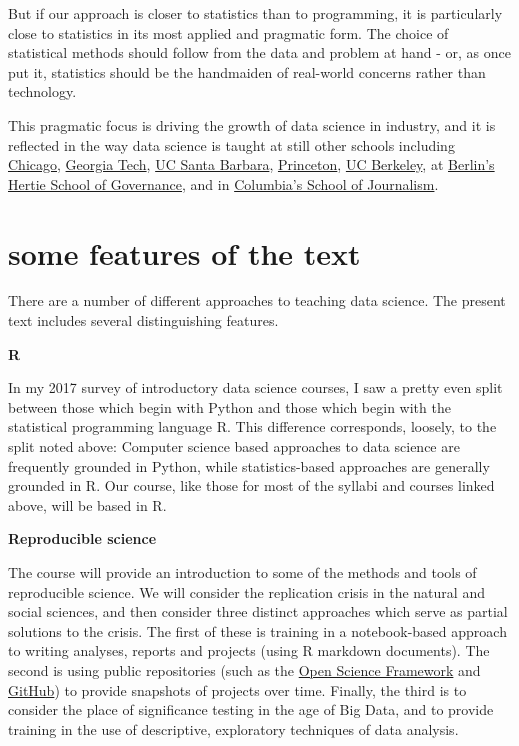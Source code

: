 \documentclass[
  openany]{book}
\begin{document}
But if our approach is closer to statistics than to programming, it is particularly close to statistics in its most applied and pragmatic form. The choice of statistical methods should follow from the data and problem at hand - or, as \citet{loevinger1957objective} once put it, statistics should be the handmaiden of real-world concerns rather than technology.

This pragmatic focus is driving the growth of data science in industry, and it is reflected in the way data science is taught at still other schools including \href{https://github.com/UC-MACSS/persp-analysis}{Chicago}, \href{https://github.com/jacobeisenstein/gt-css-class}{Georgia Tech}, \href{https://github.com/raviolli77/dataScience-UCSBProjectGroup-Syllabus}{UC Santa Barbara}, \href{http://www.princeton.edu/~mjs3/soc596_f2016/}{Princeton}, \href{https://github.com/rochelleterman/PS239T}{UC Berkeley}, at \href{https://github.com/HertieDataScience/SyllabusAndLectures}{Berlin's Hertie School of Governance}, and in \href{https://github.com/tommeagher/data1-fall2015}{Columbia's School of Journalism}.

\hypertarget{some-features-of-the-text}{%
\section*{some features of the text}\label{some-features-of-the-text}}

There are a number of different approaches to teaching data science. The present text includes several distinguishing features.

\textbf{R}

In my 2017 survey of introductory data science courses, I saw a pretty even split between those which begin with Python and those which begin with the statistical programming language R. This difference corresponds, loosely, to the split noted above: Computer science based approaches to data science are frequently grounded in Python, while statistics-based approaches are generally grounded in R. Our course, like those for most of the syllabi and courses linked above, will be based in R.

\textbf{Reproducible science}

The course will provide an introduction to some of the methods and tools of reproducible science. We will consider the replication crisis in the natural and social sciences, and then consider three distinct approaches which serve as partial solutions to the crisis. The first of these is training in a notebook-based approach to writing analyses, reports and projects (using R markdown documents). The second is using public repositories (such as the \href{https://osf.io/}{Open Science Framework} and \href{https://github.com/}{GitHub}) to provide snapshots of projects over time. Finally, the third is to consider the place of significance testing in the age of Big Data, and to provide training in the use of descriptive, exploratory techniques of data analysis.
\end{document}
